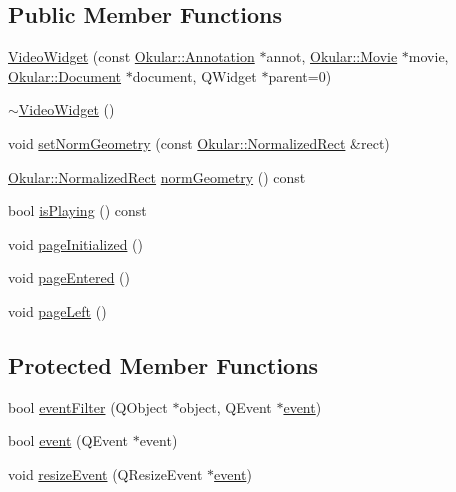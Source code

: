 \subsection*{Public Member Functions}
\begin{DoxyCompactItemize}
\item 
\hyperlink{classVideoWidget_a1a1da2f3d13d601b3fdebfeecc3335cc}{Video\+Widget} (const \hyperlink{classOkular_1_1Annotation}{Okular\+::\+Annotation} $\ast$annot, \hyperlink{classOkular_1_1Movie}{Okular\+::\+Movie} $\ast$movie, \hyperlink{classOkular_1_1Document}{Okular\+::\+Document} $\ast$document, Q\+Widget $\ast$parent=0)
\item 
\hyperlink{classVideoWidget_a77b8af4076f462cb5db7932e88d46829}{$\sim$\+Video\+Widget} ()
\item 
void \hyperlink{classVideoWidget_a38300e6028c19d616fed4b6f9ff441e9}{set\+Norm\+Geometry} (const \hyperlink{classOkular_1_1NormalizedRect}{Okular\+::\+Normalized\+Rect} \&rect)
\item 
\hyperlink{classOkular_1_1NormalizedRect}{Okular\+::\+Normalized\+Rect} \hyperlink{classVideoWidget_a44ccb0d6b334ca89f1edfa713137128f}{norm\+Geometry} () const 
\item 
bool \hyperlink{classVideoWidget_a74473d8bebf53f26a6ab985621c84fee}{is\+Playing} () const 
\item 
void \hyperlink{classVideoWidget_a90dbdcbaffc7717c7e3b327ad076bc58}{page\+Initialized} ()
\item 
void \hyperlink{classVideoWidget_ad7ddc0da1795a191cd53618e71b7b937}{page\+Entered} ()
\item 
void \hyperlink{classVideoWidget_a332a8907b98df63648b90f6ae6d42cac}{page\+Left} ()
\end{DoxyCompactItemize}
\subsection*{Protected Member Functions}
\begin{DoxyCompactItemize}
\item 
bool \hyperlink{classVideoWidget_a416581ebf72ae21a24dce839bec27905}{event\+Filter} (Q\+Object $\ast$object, Q\+Event $\ast$\hyperlink{classVideoWidget_afdc471d8ae343463a803a8dce835221c}{event})
\item 
bool \hyperlink{classVideoWidget_afdc471d8ae343463a803a8dce835221c}{event} (Q\+Event $\ast$event)
\item 
void \hyperlink{classVideoWidget_a535271277b91deed6d52cb1d11caf80d}{resize\+Event} (Q\+Resize\+Event $\ast$\hyperlink{classVideoWidget_afdc471d8ae343463a803a8dce835221c}{event})
\end{DoxyCompactItemize}


